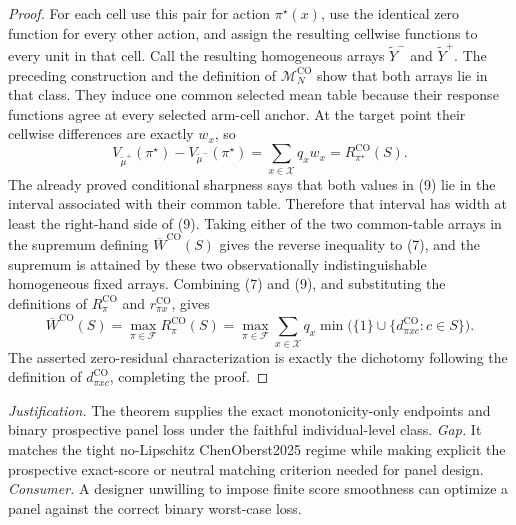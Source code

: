 \documentclass{article}
\begin{document}
\begin{proof}
For each cell use this pair for action \(\pi^\star(x)\), use the identical zero function for every other action, and assign the resulting cellwise functions to every unit in that cell.  Call the resulting homogeneous arrays \(\widetilde Y^-\) and \(\widetilde Y^+\).  The preceding construction and the definition of \(\mathcal M_N^{\mathrm{CO}}\) show that both arrays lie in that class.  They induce one common selected mean table because their response functions agree at every selected arm-cell anchor.  At the target point their cellwise differences are exactly \(w_x\), so
\[
V_{\widetilde\mu^+}(\pi^\star)
-V_{\widetilde\mu^-}(\pi^\star)
=\sum_{x\in\mathcal X}q_x w_x
=R^{\mathrm{CO}}_{\pi^\star}(S).
\tag{9}
\]
The already proved conditional sharpness says that both values in (9) lie in the interval associated with their common table.  Therefore that interval has width at least the right-hand side of (9).  Taking either of the two common-table arrays in the supremum defining \(\overline W^{\mathrm{CO}}(S)\) gives the reverse inequality to (7), and the supremum is attained by these two observationally indistinguishable homogeneous fixed arrays.  Combining (7) and (9), and substituting the definitions of \(R^{\mathrm{CO}}_\pi\) and \(r^{\mathrm{CO}}_{\pi x}\), gives
\[
\overline W^{\mathrm{CO}}(S)
=\max_{\pi\in\mathcal F}R^{\mathrm{CO}}_\pi(S)
=\max_{\pi\in\mathcal F}\sum_{x\in\mathcal X}q_x
\min\bigl(\{1\}\cup\{d^{\mathrm{CO}}_{\pi xc}:c\in S\}\bigr).
\]
The asserted zero-residual characterization is exactly the dichotomy following the definition of \(d^{\mathrm{CO}}_{\pi xc}\), completing the proof.
\end{proof}
\par\smallskip\noindent \textit{Justification.} The theorem supplies the exact monotonicity-only endpoints and binary prospective panel loss under the faithful individual-level class. \textit{Gap.} It matches the tight no-Lipschitz ChenOberst2025 regime while making explicit the prospective exact-score or neutral matching criterion needed for panel design. \textit{Consumer.} A designer unwilling to impose finite score smoothness can optimize a panel against the correct binary worst-case loss.
\end{document}
